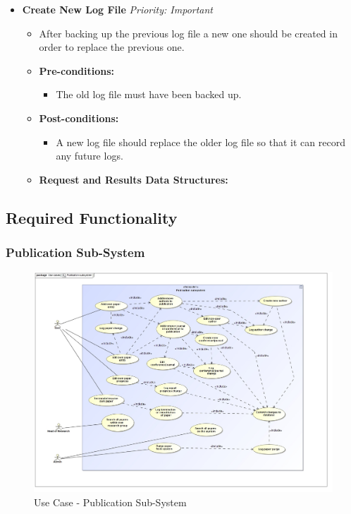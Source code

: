 \documentclass{article}
\begin{document}
\begin{itemize}
					\item \textbf{Create New Log File} \hfill \textit{Priority: Important}
					\begin{itemize}
						\item After backing up the previous log file a new one should be created in order to replace the previous one.
						\item \textbf{Pre-conditions:}
						\begin{itemize}
							\item The old log file must have been backed up.
						\end{itemize}
						\item \textbf{Post-conditions:}
						\begin{itemize}
							\item A new log file should replace the older log file so that it can record any future logs.
						\end{itemize}
						\item \textbf{Request and Results Data Structures:}
					\end{itemize}
				\end{itemize}
			
		\cleardoublepage
		\subsection{Required Functionality}\label{subsec:requiredfunctionionality}
			\subsubsection{Publication Sub-System}
			\begin{figure}[H]
				\includegraphics[width=\linewidth]{../Diagrams/Use Cases/Publication subsystem.jpg}
				\caption{Use Case - Publication Sub-System}
			\end{figure}
			
\end{document}
